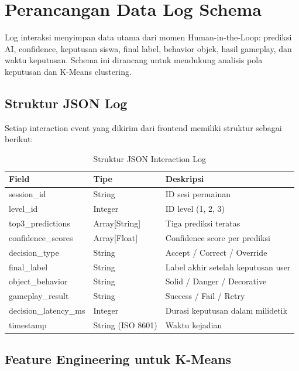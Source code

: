 \section{Perancangan Data Log Schema}

Log interaksi menyimpan data utama dari momen Human-in-the-Loop: prediksi AI, confidence, keputusan siswa, final label, behavior objek, hasil gameplay, dan waktu keputusan. Schema ini dirancang untuk mendukung analisis pola keputusan dan K-Means clustering.

\subsection{Struktur JSON Log}

Setiap interaction event yang dikirim dari frontend memiliki struktur sebagai berikut:

\begin{table}[ht]
\centering
\caption{Struktur JSON Interaction Log}
\label{tab:json-log}
\begin{tabular}{|l|l|l|}
\hline
\textbf{Field} & \textbf{Tipe} & \textbf{Deskripsi} \\ \hline
session\_id & String & ID sesi permainan \\ \hline
level\_id & Integer & ID level (1, 2, 3) \\ \hline
top3\_predictions & Array[String] & Tiga prediksi teratas \\ \hline
confidence\_scores & Array[Float] & Confidence score per prediksi \\ \hline
decision\_type & String & Accept / Correct / Override \\ \hline
final\_label & String & Label akhir setelah keputusan user \\ \hline
object\_behavior & String & Solid / Danger / Decorative \\ \hline
gameplay\_result & String & Success / Fail / Retry \\ \hline
decision\_latency\_ms & Integer & Durasi keputusan dalam milidetik \\ \hline
timestamp & String (ISO 8601) & Waktu kejadian \\ \hline
\end{tabular}
\end{table}

\subsection{Feature Engineering untuk K-Means}

